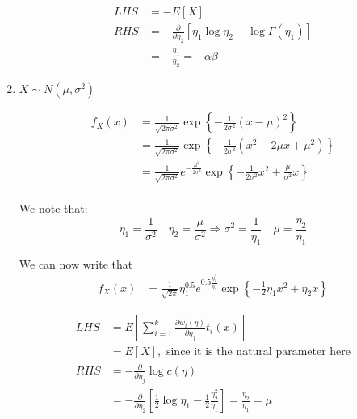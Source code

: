 \documentclass{article}
\begin{document}
\begin{enumerate}
    \begin{equation*}
        \begin{split}
            LHS &= -E[X]\\
            RHS &= -\frac{\partial}{\partial \eta_2} \left[ \eta_1 \log\eta_2 - \log \Gamma(\eta_1) \right]\\
                &= -\frac{\eta_1}{\eta_2} = - \alpha\beta
        \end{split}
    \end{equation*}
    
    \item $X \sim N(\mu,\sigma^2)$

    \begin{equation*}
    \begin{split}
        f_X(x) &= \frac{1}{\sqrt{2\pi\sigma^2}} \exp \left\{ -\frac{1}{2\sigma^2}(x-\mu)^2 \right\}\\
        &= \frac{1}{\sqrt{2\pi\sigma^2}} \exp \left\{ -\frac{1}{2\sigma^2}(x^2-2\mu x + \mu^2) \right\}\\
        &= \frac{1}{\sqrt{2\pi\sigma^2}} e^{-\frac{\mu^2}{2\sigma^2}} \exp \left\{ -\frac{1}{2\sigma^2}x^2 + \frac{\mu}{\sigma^2} x \right\}\\
    \end{split}
    \end{equation*}    
    
    We note that:
    \begin{equation*}
        \eta_1 = \frac{1}{\sigma^2}\quad \eta_2 = \frac{\mu}{\sigma^2} \Rightarrow \sigma^2 = \frac{1}{\eta_1} \quad \mu = \frac{\eta_2}{\eta_1}
    \end{equation*}
    
    We can now write that
    \begin{equation*}
        \begin{split}
            f_X(x) &= \frac{1}{\sqrt{2\pi}} \eta_1^{0.5} e^{0.5\frac{\eta_2^2}{\eta_1}} \exp\left\{ -\frac{1}{2} \eta_1 x^2 + \eta_2 x \right\}
        \end{split}
    \end{equation*}
    
    \begin{equation*}
        \begin{split}
            LHS &= E\left[ \sum_{i=1}^k \frac{\partial w_i(\eta)}{\partial \eta_j} t_i(x) \right] \\
                &= E[X], \text{ since it is the natural parameter here}\\
            RHS &= -\frac{\partial}{\partial \eta_j} \log c(\eta)\\
                &= -\frac{\partial}{\partial \eta_2} \left[\frac{1}{2}\log \eta_1 - \frac{1}{2}\frac{\eta_2^2}{\eta_1}\right] = \frac{\eta_2}{\eta_1} = \mu
        \end{split}
    \end{equation*}
    

\end{enumerate}
\end{document}
